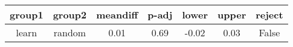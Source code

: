 \begin{tabular}{|c|c|c|c|c|c|c|}
\toprule
group1 &  group2 &  meandiff &  p-adj &  lower &  upper &  reject \\
\midrule
 learn &  random &      0.01 &   0.69 &  -0.02 &   0.03 &   False \\
\bottomrule
\end{tabular}
